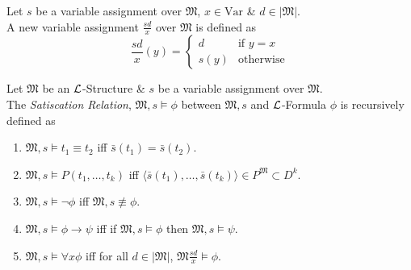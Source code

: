 \documentclass[11pt,a4paper]{article}
\begin{document}
\theorem{}
Let $s$ be a variable assignment over $\mathfrak{M}$, $x\in\text{Var}$ \& $d\in|\mathfrak{M}|$.\\
A new variable assignment $\frac{sd}{x}$ over $\mathfrak{M}$ is defined as
$$\frac{sd}{x}(y)=\begin{cases}d&\text{if }y=x\\s(y)&\text{otherwise}\end{cases}$$

Let $\mathfrak{M}$ be an $\mathcal{L}$-Structure \& $s$ be a variable assignment over $\mathfrak{M}$.\\
The \textit{Satiscation Relation}, $\mathfrak{M},s\vDash\phi$ between $\mathfrak{M},s$ and $\mathcal{L}$-Formula $\phi$ is recursively defined as
\begin{enumerate}
	\item $\mathfrak{M},s\vDash t_1\equiv t_2$ iff $\bar{s}(t_1)=\bar{s}(t_2)$.
	\item $\mathfrak{M},s\vDash P(t_1,\dots,t_k)$ iff $\langle\bar{s}(t_1),\dots,\bar{s}(t_k)\rangle\in P^\mathfrak{M}\subset D^k$.
	\item $\mathfrak{M},s\vDash \neg\phi$ iff $\mathfrak{M},s\not\equiv\phi$.
	\item $\mathfrak{M},s\vDash\phi\to\psi$ iff if $\mathfrak{M},s\vDash\phi$ then $\mathfrak{M},s\vDash\psi$.
	\item $\mathfrak{M},s\vDash \forall x\phi$ iff for all $d\in|\mathfrak{M}|$, $\mathfrak{M}\frac{sd}{x}\vDash\phi$.
\end{enumerate}
\end{document}
